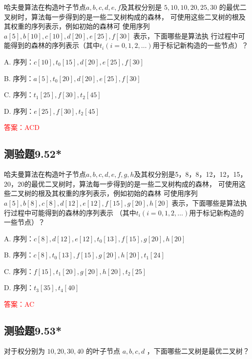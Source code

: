 \documentclass[UTF8, heading=true]{ctexart}
\begin{document}
哈夫曼算法在构造叶子节点$a,b,c,d,e,f$及其权分别是 $5,10,10,20,25,30$ 的最优二叉树时，算法每一步得到的是一些二叉树构成的森林，
可使用这些二叉树的根及其权重的序列表示，例如初始的森林可
使用序列 $a[5], b[10], c[10], d[20], e[25], f[30]$ 表示，下面哪些是算法执
行过程中可能得到的森林的序列表示（其中$t_i(i=0,1,2, \dots )$用于标记新构造的一些节点）？

A. 序列：$c[10],t_0[15],d[20],e[25],f[30]$

B. 序列：$a[5], t_0[20], d[20], e[25], f[30]$

C. 序列：$t_1[25],f[30], t_2[45]$

D. 序列：$e[25], f[30], t_2[45]$

\textcolor{red}{答案：ACD}

\subsection{测验题9.52*}

哈夫曼算法在构造叶子节点$a,b,c,d,e,f,g,h$及其权分别是5，8，8，12，12，15，20，20的最优二叉树时，算法每一步得到的是一些二叉树构成的森林，
可使用这些二叉树的根及其权重的序列表示，例如初始的森林
可使用序列$a[5],b[8],c[8],d[12],e[12],f[15],g[20],h[20]$
表示，下面哪些是算法执行过程中可能得到的森林的序列表示 （其中$t_{i}({i}=0,1,2, \ldots)$用于标记新构造的一些节点）？

A. 序列：$c[8],d[12],e[12],t_0[13],f[15],g[20],h[20]$

B. 序列：$c[8],t_0[13],f[15],g[20],h[20],t_1[24]$

C. 序列：$f[15],t_1[20],g[20],h[20],t_2[25]$

D. 序列：$t_3[35],t_4[40]$

\textcolor{red}{答案：AC}

\subsection{测验题9.53*}

对于权分别为 $10,20,30,40$ 的叶子节点 $a, b, c, d$ ，下面哪些二叉树是最优二叉树？
\end{document}
